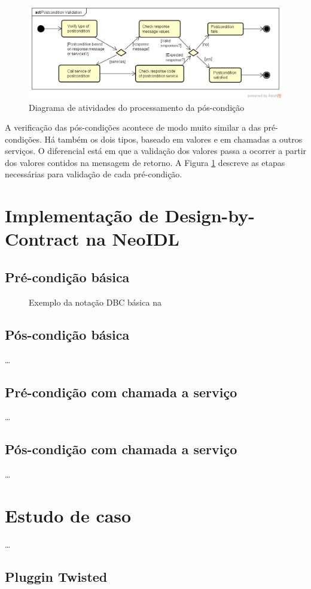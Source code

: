 \begin{figure}[!htb]
\centering
\includegraphics[width=\textwidth,trim = 0mm 5mm 0mm
0mm,clip]{PostconditionValidation.png} 
\vspace{-6mm}
\caption{Diagrama de atividades do processamento da pós-condição}
\label{FigServicePostcondition}
\end{figure}

A verificação das pós-condições acontece de modo muito similar a das
pré-condições. Há também os dois tipos, baseado em valores e em chamadas a
outros serviços. O diferencial está em que a validação dos valores passa a
ocorrer a partir dos valores contidos na mensagem de retorno. A Figura
\ref{FigServicePostcondition} descreve as etapas necessárias para validação de
cada pré-condição.

	

\section{Implementação de Design-by-Contract na NeoIDL}

\subsection{Pré-condição básica}

\begin{figure}[htb]
\begin{small}

\end{small}
\caption{Exemplo da notação DBC básica na \neoidl}
\label{lst:DBCService}
\end{figure}

\subsection{Pós-condição básica}

\ldots

\subsection{Pré-condição com chamada a serviço}

\ldots

\subsection{Pós-condição com chamada a serviço}

\ldots

\section{Estudo de caso}

\ldots

\subsection{Pluggin Twisted}

